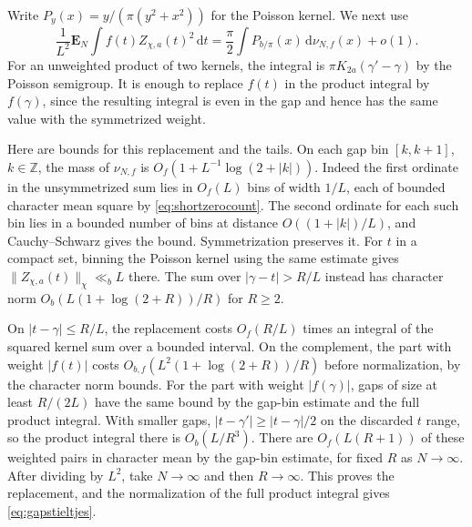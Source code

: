 \documentclass[11pt,a4paper]{article}
\numberwithin{equation}{section}
\newcommand{\ud}{\mathrm d}
\begin{document}
Write $P_y(x)=y/(\pi(y^2+x^2))$ for the Poisson kernel.
We next use
\begin{equation}
 \frac1{L^2}\mathbf E_N\int f(t)Z_{\chi,a}(t)^2\,\ud t
       =\frac{\pi}{2}\int P_{b/\pi}(x)\,\ud\nu_{N,f}(x)+o(1).
 \label{eq:gapstieltjes}
\end{equation}
For an unweighted product of two kernels, the integral is
$\pi K_{2a}(\gamma'-\gamma)$ by the Poisson semigroup.
It is enough to replace $f(t)$ in the product integral by
$f(\gamma)$, since the resulting integral is even in the gap
and hence has the same value with the symmetrized weight.

Here are bounds for this replacement and the tails. On each
gap bin $[k,k+1]$, $k\in\mathbb Z$, the mass of $\nu_{N,f}$
is $O_f(1+L^{-1}\log(2+|k|))$. Indeed the first ordinate
in the unsymmetrized sum lies in $O_f(L)$ bins of width
$1/L$, each of bounded character mean square by
\cref{eq:shortzerocount}. The second ordinate for each such
bin lies in a bounded number of bins at distance $O((1+|k|)/L)$,
and Cauchy--Schwarz gives the bound. Symmetrization preserves it.
For $t$ in a compact set, binning the Poisson kernel using
the same estimate gives $\|Z_{\chi,a}(t)\|_\chi\ll_b L$ there.
The sum over $|\gamma-t|>R/L$ instead has character norm
$O_b(L(1+\log(2+R))/R)$ for $R\ge2$.

On $|t-\gamma|\le R/L$, the replacement costs $O_f(R/L)$
times an integral of the squared kernel sum over a bounded
interval. On the complement, the part with weight $|f(t)|$
costs $O_{b,f}(L^2(1+\log(2+R))/R)$ before normalization,
by the character norm bounds. For the part with weight
$|f(\gamma)|$, gaps of size at least $R/(2L)$ have the same
bound by the gap-bin estimate and the full product integral.
With smaller gaps, $|t-\gamma'|\ge |t-\gamma|/2$ on the
discarded $t$ range, so the product integral there is
$O_b(L/R^3)$. There are $O_f(L(R+1))$ of these weighted
pairs in character mean by the gap-bin estimate, for fixed
$R$ as $N\to\infty$. After dividing by $L^2$, take $N\to\infty$
and then $R\to\infty$. This proves the replacement, and the
normalization of the full product integral gives
\cref{eq:gapstieltjes}.
\end{document}

